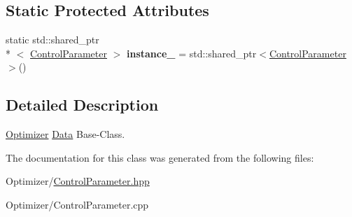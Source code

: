 \subsection*{Static Protected Attributes}
\begin{DoxyCompactItemize}
\item 
\hypertarget{class_control_parameter_a0e8240e3b7bc2300a9015a82751c72a6}{static std\-::shared\-\_\-ptr\\*
$<$ \hyperlink{class_control_parameter}{Control\-Parameter} $>$ {\bfseries instance\-\_\-} = std\-::shared\-\_\-ptr$<$\hyperlink{class_control_parameter}{Control\-Parameter}$>$()}\label{class_control_parameter_a0e8240e3b7bc2300a9015a82751c72a6}

\end{DoxyCompactItemize}


\subsection{Detailed Description}
\hyperlink{class_optimizer}{Optimizer} \hyperlink{class_data}{Data} Base-\/\-Class. 

The documentation for this class was generated from the following files\-:\begin{DoxyCompactItemize}
\item 
Optimizer/\hyperlink{_control_parameter_8hpp}{Control\-Parameter.\-hpp}\item 
Optimizer/Control\-Parameter.\-cpp\end{DoxyCompactItemize}
